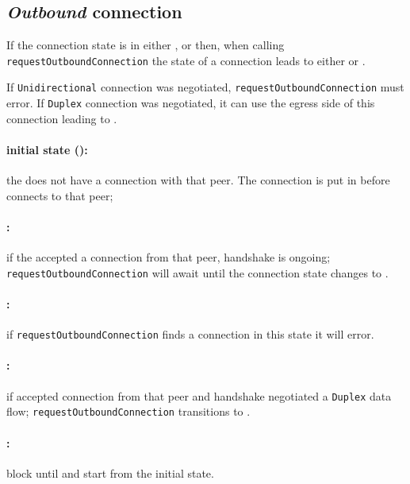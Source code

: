 \subsection{\textit{Outbound} connection}

If the connection state is in either \ReservedOutboundState{},
\UnnegotiatedStateIn{} or \InboundStateDup{} then, when calling
\texttt{requestOutboundConnection} the state of a connection leads to either
\OutboundStateUni{} or \DuplexState{}.

If \texttt{Unidirectional} connection was
negotiated, \texttt{requestOutboundConnection} must error. If \texttt{Duplex}
connection was negotiated, it can use the egress side of this connection leading
to \DuplexState{}.

\paragraph{\textnormal{initial state (\InitialState{})}:} the \connmngr{} does not have
  a connection with that peer. The connection is put in \ReservedOutboundState{}
  before \connmngr{} connects to that peer;

\paragraph{\UnnegotiatedStateIn{}:} if the \connmngr{} accepted
  a connection from that peer, handshake is ongoing;
  \texttt{requestOutboundConnection} will await until the connection state
  changes to \InboundStateAny{}.

\paragraph{\InboundStateUni{}:} if \texttt{requestOutboundConnection} finds
a connection in this state it will error.

\paragraph{\InboundStateDup{}:} if \connmngr{} accepted connection from
  that peer and handshake negotiated a \texttt{Duplex} data flow;
  \texttt{requestOutboundConnection} transitions to \DuplexState{}.

\paragraph{\TerminatingState{}:} block until \TerminatedState{} and start from
the initial state.

